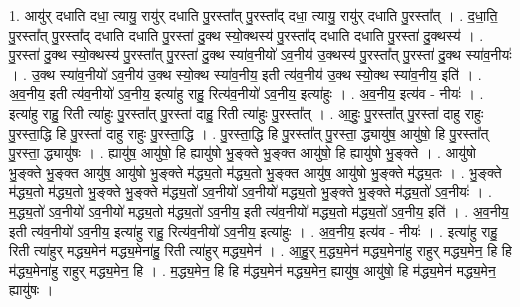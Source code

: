 \documentclass[17pt]{extarticle}
\begin{document}
1. आयु॑र् दधाति दधा॒ त्यायु॒ रायु॑र् दधाति पु॒रस्ता᳚त् पु॒रस्ता᳚द् दधा॒ त्यायु॒ रायु॑र् दधाति पु॒रस्ता᳚त् । . द॒धा॒ति॒ पु॒रस्ता᳚त् पु॒रस्ता᳚द् दधाति दधाति पु॒रस्ता॑ दु॒क्थ स्यो॒क्थस्य॑ पु॒रस्ता᳚द् दधाति दधाति पु॒रस्ता॑ दु॒क्थस्य॑ । . पु॒रस्ता॑ दु॒क्थ स्यो॒क्थस्य॑ पु॒रस्ता᳚त् पु॒रस्ता॑ दु॒क्थ स्या॑व॒नीयो॑ ऽव॒नीय॑ उ॒क्थस्य॑ पु॒रस्ता᳚त् पु॒रस्ता॑ दु॒क्थ स्या॑व॒नीयः॑ । . उ॒क्थ स्या॑व॒नीयो॑ ऽव॒नीय॑ उ॒क्थ स्यो॒क्थ स्या॑व॒नीय॒ इती त्य॑व॒नीय॑ उ॒क्थ स्यो॒क्थ स्या॑व॒नीय॒ इति॑ । . अ॒व॒नीय॒ इती त्य॑व॒नीयो॑ ऽव॒नीय॒ इत्या॑हु राहु॒ रित्य॑व॒नीयो॑ ऽव॒नीय॒ इत्या॑हुः । . अ॒व॒नीय॒ इत्य॑व - नीयः॑ । . इत्या॑हु राहु॒ रिती त्या॑हुः पु॒रस्ता᳚त् पु॒रस्ता॑ दाहु॒ रिती त्या॑हुः पु॒रस्ता᳚त् । . आ॒हुः॒ पु॒रस्ता᳚त् पु॒रस्ता॑ दाहु राहुः पु॒रस्ता॒द्धि हि पु॒रस्ता॑ दाहु राहुः पु॒रस्ता॒द्धि । . पु॒रस्ता॒द्धि हि पु॒रस्ता᳚त् पु॒रस्ता॒ द्ध्यायु॑ष॒ आयु॑षो॒ हि पु॒रस्ता᳚त् पु॒रस्ता॒ द्ध्यायु॑षः । . ह्यायु॑ष॒ आयु॑षो॒ हि ह्यायु॑षो भु॒ङ्क्ते भु॒ङ्क्त आयु॑षो॒ हि ह्यायु॑षो भु॒ङ्क्ते । . आयु॑षो भु॒ङ्क्ते भु॒ङ्क्त आयु॑ष॒ आयु॑षो भु॒ङ्क्ते म॑द्ध्य॒तो म॑द्ध्य॒तो भु॒ङ्क्त आयु॑ष॒ आयु॑षो भु॒ङ्क्ते म॑द्ध्य॒तः । . भु॒ङ्क्ते म॑द्ध्य॒तो म॑द्ध्य॒तो भु॒ङ्क्ते भु॒ङ्क्ते म॑द्ध्य॒तो॑ ऽव॒नीयो॑ ऽव॒नीयो॑ मद्ध्य॒तो भु॒ङ्क्ते भु॒ङ्क्ते म॑द्ध्य॒तो॑ ऽव॒नीयः॑ । . म॒द्ध्य॒तो॑ ऽव॒नीयो॑ ऽव॒नीयो॑ मद्ध्य॒तो म॑द्ध्य॒तो॑ ऽव॒नीय॒ इती त्य॑व॒नीयो॑ मद्ध्य॒तो म॑द्ध्य॒तो॑ ऽव॒नीय॒ इति॑ । . अ॒व॒नीय॒ इती त्य॑व॒नीयो॑ ऽव॒नीय॒ इत्या॑हु राहु॒ रित्य॑व॒नीयो॑ ऽव॒नीय॒ इत्या॑हुः । . अ॒व॒नीय॒ इत्य॑व - नीयः॑ । . इत्या॑हु राहु॒ रिती त्या॑हुर् मद्ध्य॒मेन॑ मद्ध्य॒मेना॑हु॒ रिती त्या॑हुर् मद्ध्य॒मेन॑ । . आ॒हु॒र् म॒द्ध्य॒मेन॑ मद्ध्य॒मेना॑हु राहुर् मद्ध्य॒मेन॒ हि हि म॑द्ध्य॒मेना॑हु राहुर् मद्ध्य॒मेन॒ हि । . म॒द्ध्य॒मेन॒ हि हि म॑द्ध्य॒मेन॑ मद्ध्य॒मेन॒ ह्यायु॑ष॒ आयु॑षो॒ हि म॑द्ध्य॒मेन॑ मद्ध्य॒मेन॒ ह्यायु॑षः । \newline
\end{document}
